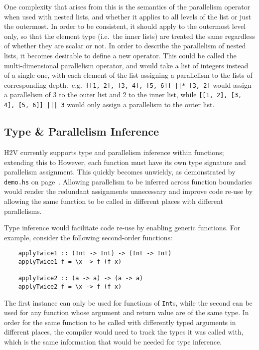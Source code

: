 \documentclass[english,onecolumn]{scrartcl}
\begin{document}
One complexity that arises from this is the semantics of the parallelism operator when used with nested lists, and whether it
applies to all levels of the list or just the outermost. In order to be consistent, it should apply to the outermost level only,
so that the element type (i.e.\ the inner lists) are treated the same regardless of whether they are scalar or not.
In order to describe the parallelism of nested lists, it becomes desirable to define a new operator. This could be called the
multi-dimensional parallelism operator, and would take a list of integers instead of a single one, with each element of the list
assigning a parallelism to the lists of corresponding depth.\ e.g.\ \texttt{[[1, 2], [3, 4], [5, 6]] ||* [3, 2]} would assign a
parallelism of 3 to the outer list and 2 to the inner list, while \texttt{[[1, 2], [3, 4], [5, 6]] ||| 3} would only assign a
parallelism to the outer list.


\subsection{Type \& Parallelism Inference}
H2V currently supports type and parallelism inference within functions; extending this to  However, each function must have its own type signature
and parallelism assignment. This quickly becomes unwieldy, as demonstrated by \texttt{demo.hs} on page~\pageref{test:demo}. Allowing
parallelism to be inferred across function boundaries would render the redundant assignments unnecessary and improve code re-use
by allowing the same function to be called in different places with different parallelisms.

Type inference would facilitate code re-use by enabling generic functions. For example, consider the following second-order functions:

\begin{lstlisting}
    applyTwice1 :: (Int -> Int) -> (Int -> Int)
    applyTwice1 f = \x -> f (f x)

    applyTwice2 :: (a -> a) -> (a -> a)
    applyTwice2 f = \x -> f (f x)
\end{lstlisting}

The first instance can only be used for functions of \texttt{Int}s, while the second can be used for any function whose argument
and return value are of the same type. In order for the same function to be called with differently typed arguments in different
places, the compiler would need to track the types it was called with, which is the same information that would be needed for type
inference.
\end{document}
